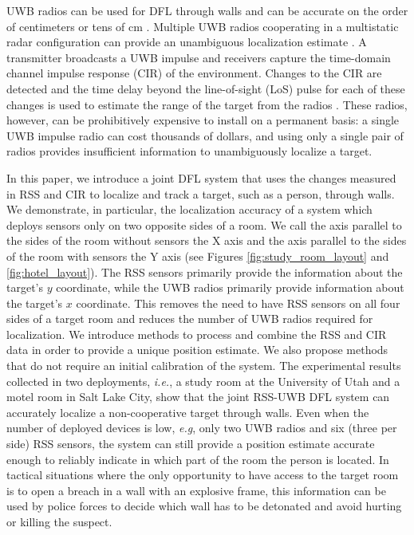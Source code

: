 \documentclass[conference]{IEEEtran}
\begin{document}
UWB radios can be used for DFL through walls and can be accurate on
the order of centimeters or tens of cm \cite{Thoma, Bartoletti}.
Multiple UWB radios cooperating in a multistatic radar configuration
can provide an unambiguous localization estimate \cite{Thoma}.  A
transmitter broadcasts a UWB impulse and receivers capture the
time-domain channel impulse response (CIR) of the environment. Changes
to the CIR are detected and the time delay beyond the line-of-sight
(LoS) pulse for each of these changes is used to estimate the range of
the target from the radios \cite{mccracken2012hidden}. These radios,
however, can be prohibitively expensive to install on a permanent
basis: a single UWB impulse radio can cost thousands of dollars, and
using only a single pair of radios provides insufficient information
to unambiguously localize a target.

In this paper, we introduce a joint DFL system that uses the changes
measured in RSS and CIR to localize and track a target, such as a
person, through walls. We demonstrate, in particular, the localization
accuracy of a system which deploys sensors only on two opposite sides
of a room. We call the axis parallel to the sides of the room without
sensors the X axis and the axis parallel to the sides of the room with
sensors the Y axis (see Figures \ref{fig:study_room_layout} and
\ref{fig:hotel_layout}). The RSS sensors primarily provide the
information about the target's $y$ coordinate, while the UWB radios
primarily provide information about the target's $x$ coordinate. This
removes the need to have RSS sensors on all four sides of a target
room and reduces the number of UWB radios required for
localization. We introduce methods to process and combine the RSS and
CIR data in order to provide a unique position estimate. We also
propose methods that do not require an initial calibration of the
system. The experimental results collected in two deployments,
\emph{i.e.}, a study room at the University of Utah and a motel room
in Salt Lake City, show that the joint RSS-UWB DFL system can
accurately localize a non-cooperative target through walls. Even when
the number of deployed devices is low, \emph{e.g}, only two UWB radios
and six (three per side) RSS sensors, the system can still provide a
position estimate accurate enough to reliably indicate in which part
of the room the person is located. In tactical situations where the
only opportunity to have access to the target room is to open a breach
in a wall with an explosive frame, this information can be used by
police forces to decide which wall has to be detonated and avoid
hurting or killing the suspect.
\end{document}
